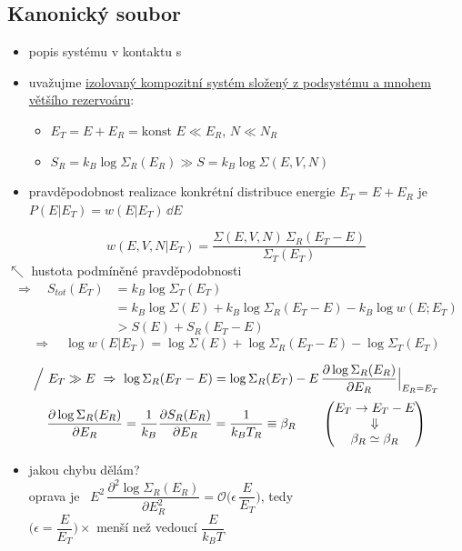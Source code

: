 \subsection{Kanonický soubor}
\begin{itemize}
  \item popis systému v kontaktu s 
  \item uvažujme \underline{izolovaný kompozitní systém složený z podsystému a mnohem většího rezervoáru}:
  \begin{itemize}[label=$\to$]
    \item $E_T = E + E_R = \text{konst}$ \qquad $E\ll E_R$, \quad $N\ll N_R$
    \item $S_R = k_B\log\Sigma_R(E_R) \gg S = k_B\log\Sigma(E,V,N)$
  \end{itemize}
  \item pravděpodobnost realizace konkrétní distribuce energie $E_T = E + E_R$ je \ $P(E|E_T) = w(E|E_T)\,\dd E$
\end{itemize}
\[
  w(E,V,N|E_T) = \frac{\Sigma(E,V,N)\,\Sigma_R(E_T - E)}{\Sigma_T(E_T)}
\]
\hspace*{2.2cm}\textcolor{NavyBlue}{$\nwarrow$ hustota podmíněné pravděpodobnosti}
\begin{align*}
  \Rightarrow\quad S_{tot}(E_T) &= k_B\log\Sigma_T(E_T) \\
  &= k_B\log\Sigma(E) + k_B\log\Sigma_R(E_T - E) - k_B\log w(E;E_T) \\
  &> S(E) + S_R(E_T - E)
\end{align*}
\[
  \Rightarrow\quad \log w(E|E_T) = \log\Sigma(E) + \log\Sigma_R(E_T - E) - \log\Sigma_T(E_T)
\]
{\color{NavyBlue}
\[
  \Big/\ E_T\gg E \ \Rightarrow\ \log\Sigma_R(E_T - E) = \log\Sigma_R(E_T) - E\,\pdv{\log\Sigma_R(E_R)}{E_R}\Big|_{E_R = E_T}
\]
\[
  \pdv{\log\Sigma_R(E_R)}{E_R} = \frac{1}{k_B}\pdv{S_R(E_R)}{E_R} = \frac{1}{k_BT_R} \equiv \beta_R
  \qquad \begin{pmatrix} E_T\to E_T - E \\ \Downarrow \\ \beta_R\simeq\beta_R\end{pmatrix}
\]
\begin{itemize}
  \item jakou chybu dělám? \\
        oprava je \ $E^2\,\dfrac{\partial^2\log\Sigma_R(E_R)}{\partial E_R^2} = \mathcal{O}\Big(\epsilon\,\dfrac{E}{E_T}\Big)$, tedy \\
        $\Big(\epsilon = \dfrac{E}{E_T}\Big)\times$ menší než vedoucí $\dfrac{E}{k_BT}$
\end{itemize}
}

